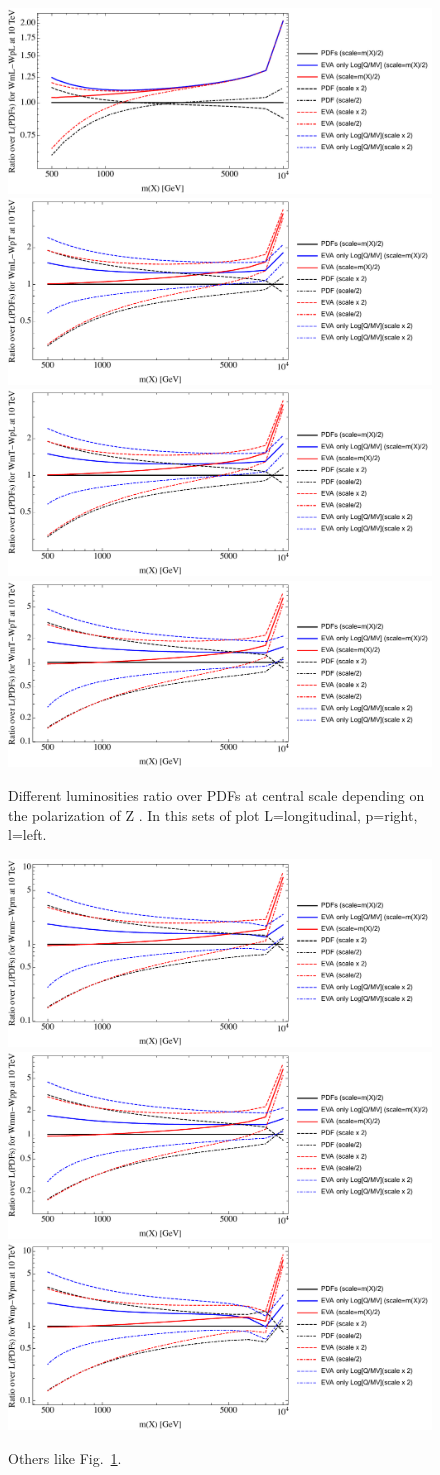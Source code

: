 \documentclass[a4paper,11pt]{article}
\begin{document}
 
 \begin{figure}[!t]
\includegraphics[width=0.46\linewidth]{Notebooks/PlotLumi/10TeV/ratios/WmL-WpL.pdf}
\includegraphics[width=0.46\linewidth]{Notebooks/PlotLumi/10TeV/ratios/WmL-WpT.pdf}
\includegraphics[width=0.46\linewidth]{Notebooks/PlotLumi/10TeV/ratios/WmT-WpL.pdf}
\includegraphics[width=0.46\linewidth]{Notebooks/PlotLumi/10TeV/ratios/WmT-WpT.pdf}
\caption{Different luminosities ratio over PDFs at central scale depending on the polarization of Z \label{fig:lumiratioWWpol}. In this sets of plot L=longitudinal, p=right, l=left.}
\end{figure}

\begin{figure}[!t]
\includegraphics[width=0.46\linewidth]{Notebooks/PlotLumi/10TeV/ratios/Wmm-Wpm.pdf}
\includegraphics[width=0.46\linewidth]{Notebooks/PlotLumi/10TeV/ratios/Wmm-Wpp.pdf}
\includegraphics[width=0.46\linewidth]{Notebooks/PlotLumi/10TeV/ratios/Wmp-Wpm.pdf}
\caption{Others like Fig.~\ref{fig:lumiratioWWpol}. \label{fig:lumiratioWWpol2}}
\end{figure}
\end{document}
